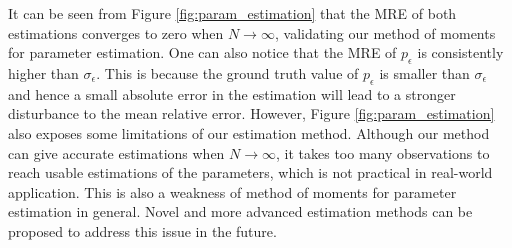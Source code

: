It can be seen from Figure \ref{fig:param_estimation} that the MRE of both estimations converges to zero when $N\to\infty$, validating our method of moments for parameter estimation. One can also notice that the MRE of $p_\epsilon$ is consistently higher than $\sigma_\epsilon$. This is because the ground truth value of $p_\epsilon$ is smaller than $\sigma_\epsilon$ and hence a small absolute error in the estimation will lead to a stronger disturbance to the mean relative error. However, Figure \ref{fig:param_estimation} also exposes some limitations of our estimation method. Although our method can give accurate estimations when $N\to\infty$, it takes too many observations to reach usable estimations of the parameters, which is not practical in real-world application. This is also a weakness of method of moments for parameter estimation in general. Novel and more advanced estimation methods can be proposed to address this issue in the future.